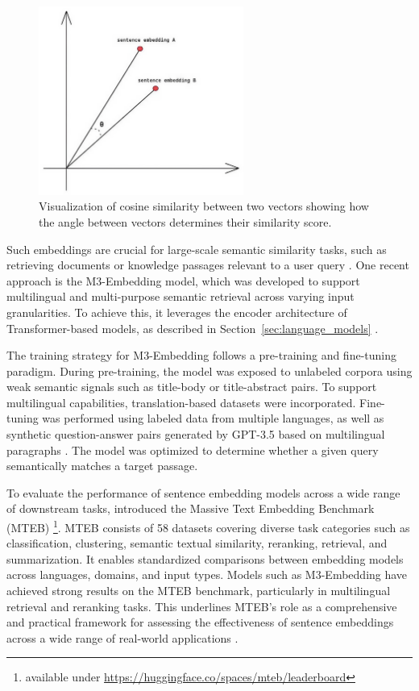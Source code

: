 \documentclass[a4paper,oneside,bibliography=totoc]{scrbook}
\begin{document}
\begin{figure}[t]
  \centering
  \includegraphics[width=0.6\textwidth]{figures/cosine_similarity.jpeg}
  \caption[Visualization of cosine similarity between two vectors showing how the angle between vectors determines their similarity score]{Visualization of cosine similarity between two vectors showing how the angle between vectors determines their similarity score. \cite{Leys2022}}
  \label{fig:cosine_similarity}
\end{figure}

Such embeddings are crucial for large-scale semantic similarity tasks, such as retrieving documents or knowledge passages relevant to a user query \cite{Reimers2019,Gao2024}. One recent approach is the M3-Embedding model, which was developed to support multilingual and multi-purpose semantic retrieval across varying input granularities. To achieve this, it leverages the encoder architecture of Transformer-based models, as described in Section~\ref{sec:language_models} \cite{Chen2024}.

The training strategy for M3-Embedding follows a pre-training and fine-tuning paradigm. During pre-training, the model was exposed to unlabeled corpora using weak semantic signals such as title-body or title-abstract pairs. To support multilingual capabilities, translation-based datasets were incorporated. Fine-tuning was performed using labeled data from multiple languages, as well as synthetic question-answer pairs generated by \ac{GPT}-3.5 based on multilingual paragraphs \cite{Chen2024}. The model was optimized to determine whether a given query semantically matches a target passage.

To evaluate the performance of sentence embedding models across a wide range of downstream tasks, \citet{Muennighoff2023} introduced the Massive Text Embedding Benchmark (MTEB) \footnote{available under \url{https://huggingface.co/spaces/mteb/leaderboard}}. MTEB consists of 58 datasets covering diverse task categories such as classification, clustering, semantic textual similarity, reranking, retrieval, and summarization. It enables standardized comparisons between embedding models across languages, domains, and input types. Models such as M3-Embedding have achieved strong results on the MTEB benchmark, particularly in multilingual retrieval and reranking tasks. This underlines MTEB’s role as a comprehensive and practical framework for assessing the effectiveness of sentence embeddings across a wide range of real-world applications \cite{Muennighoff2023}.
\end{document}
